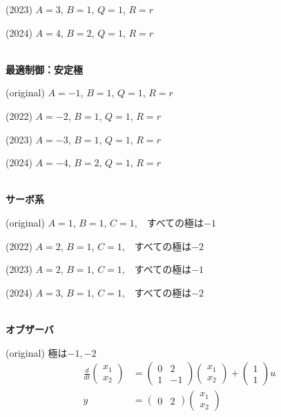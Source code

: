 (2023)
{\color{red}$A=3$}, $B=1$, $Q=1$, $R=r$

(2024)
{\color{red}$A=4$, $B=2$}, $Q=1$, $R=r$

\ \\ \noindent
{\bf 最適制御：安定極}

(original)
$A=-1$, $B=1$, $Q=1$, $R=r$

(2022)
{\color{red}$A=-2$}, $B=1$, $Q=1$, $R=r$

(2023)
{\color{red}$A=-3$}, $B=1$, $Q=1$, $R=r$

(2024)
{\color{red}$A=-4$, $B=2$}, $Q=1$, $R=r$

\ \\ \noindent
{\bf サーボ系}

(original)
$A=1$, $B=1$, $C=1$,　すべての極は$-1$

(2022)
{\color{red}$A=2$}, $B=1$, $C=1$,　すべての極は{\color{red}$-2$}

(2023)
{\color{red}$A=2$}, $B=1$, $C=1$,　すべての極は{\color{red}$-1$}

(2024)
{\color{red}$A=3$}, $B=1$, $C=1$,　すべての極は{\color{red}$-2$}

\ \\ \noindent
{\bf オブザーバ}

(original) 極は$-1, -2$
\begin{align*}
	\frac{d}{dt}
	\left (
	\begin{array}{c}
	 x_1 \\ x_2 
	\end{array}
	\right )
	& = 
	\left (
	\begin{array}{cc}
	 0 & 2 \\
	 1 & -1
	\end{array}
	\right )
	\left (
	\begin{array}{c}
	 x_1 \\ x_2 
	\end{array}
	\right )
	+
	\left (
	\begin{array}{c}
	 1 \\ 1 
	\end{array}
	\right )
	u
\\
	y&=
	\left ( \begin{array}{cc}
		0 & 2 
	\end{array} \right )
	\left (	\begin{array}{c}
		x_1 \\ x_2 
	\end{array} \right )
\end{align*}

